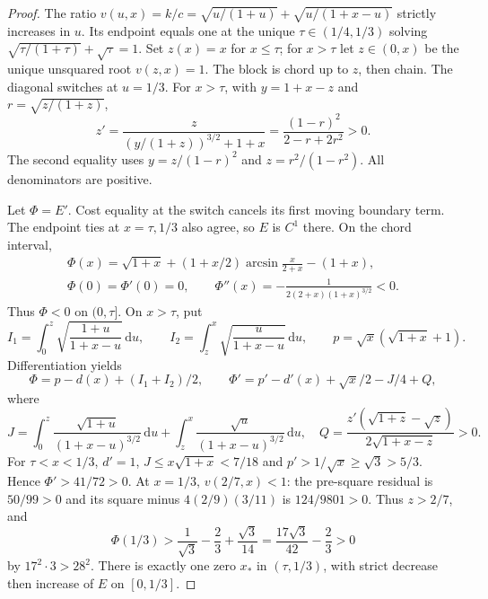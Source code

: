 \documentclass[11pt,letterpaper]{article}
\newcommand{\dd}{\,\mathrm d}
\begin{document}
\begin{proof}
The ratio $v(u,x)=k/c=\sqrt{u/(1+u)}+\sqrt{u/(1+x-u)}$
strictly increases in $u$. Its endpoint equals one at the unique
$\tau\in(1/4,1/3)$ solving
$\sqrt{\tau/(1+\tau)}+\sqrt\tau=1$.
Set $z(x)=x$ for $x\le\tau$; for $x>\tau$ let $z\in(0,x)$ be
the unique unsquared root $v(z,x)=1$. The block is chord up to $z$,
then chain. The diagonal switches at $u=1/3$.
For $x>\tau$, with $y=1+x-z$ and $r=\sqrt{z/(1+z)}$,
\begin{equation}\label{eq:zprime}
 z'=\frac{z}{(y/(1+z))^{3/2}+1+x}
    =\frac{(1-r)^2}{2-r+2r^2}>0.
\end{equation}
The second equality uses $y=z/(1-r)^2$ and $z=r^2/(1-r^2)$.
All denominators are positive.

Let $\Phi=E'$. Cost equality at the switch cancels its first moving
boundary term. The endpoint ties at $x=\tau,1/3$ also agree, so $E$
is $C^1$ there. On the chord interval,
\begin{gather*}
 \Phi(x)=\sqrt{1+x}+(1+x/2)\arcsin\frac{x}{2+x}-(1+x),\\
 \Phi(0)=\Phi'(0)=0,\qquad
 \Phi''(x)=-\frac1{2(2+x)(1+x)^{3/2}}<0.
\end{gather*}
Thus $\Phi<0$ on $(0,\tau]$. On $x>\tau$, put
\[
 I_1=\int_0^z\sqrt{\frac{1+u}{1+x-u}}\dd u,\qquad
 I_2=\int_z^x\sqrt{\frac u{1+x-u}}\dd u,\qquad
 p=\sqrt x(\sqrt{1+x}+1).
\]
Differentiation yields
\begin{equation}\label{eq:Phi}
 \Phi=p-d(x)+(I_1+I_2)/2,\qquad
 \Phi'=p'-d'(x)+\sqrt x/2-J/4+Q,
\end{equation}
where
\[
 J=\int_0^z\frac{\sqrt{1+u}}{(1+x-u)^{3/2}}\dd u
   +\int_z^x\frac{\sqrt u}{(1+x-u)^{3/2}}\dd u,\quad
 Q=\frac{z'(\sqrt{1+z}-\sqrt z)}{2\sqrt{1+x-z}}>0.
\]
For $\tau<x<1/3$, $d'=1$, $J\le x\sqrt{1+x}<7/18$ and
$p'>1/\sqrt x\ge\sqrt3>5/3$. Hence $\Phi'>41/72>0$.
At $x=1/3$, $v(2/7,x)<1$: the pre-square residual is $50/99>0$
and its square minus $4(2/9)(3/11)$ is $124/9801>0$.
Thus $z>2/7$, and
\[
 \Phi(1/3)>\frac1{\sqrt3}-\frac23+\frac{\sqrt3}{14}
 =\frac{17\sqrt3}{42}-\frac23>0
\]
by $17^2\cdot3>28^2$. There is exactly one zero $x_*$ in
$(\tau,1/3)$, with strict decrease then increase of $E$ on $[0,1/3]$.


\end{proof}
\end{document}
